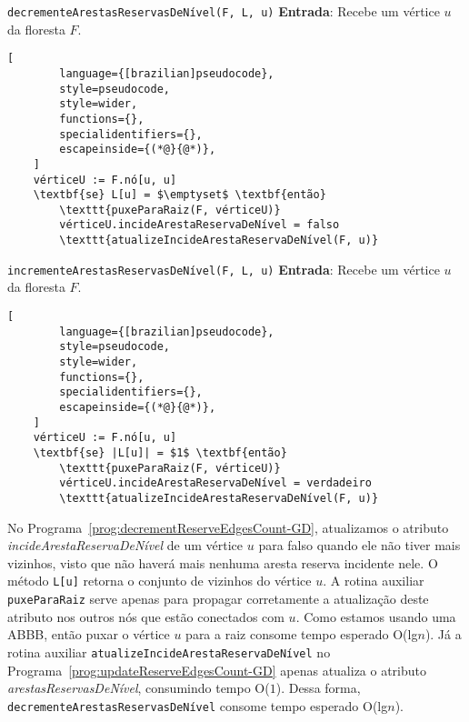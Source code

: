 \begin{programruledcaption}{\texttt{decrementeArestasReservasDeNível(F, L, u)} \label{prog:decrementReserveEdgesCount-GD}}
    \noindent\textbf{Entrada}: Recebe um vértice $u$ da floresta $F$.
    \vspace{-0.5\baselineskip}
    \begin{lstlisting}[
        language={[brazilian]pseudocode},
        style=pseudocode,
        style=wider,
        functions={},
        specialidentifiers={},
        escapeinside={(*@}{@*)},
    ]
    vérticeU := F.nó[u, u]
    \textbf{se} L[u] = $\emptyset$ \textbf{então} 
        \texttt{puxeParaRaiz(F, vérticeU)}
        vérticeU.incideArestaReservaDeNível = falso
        \texttt{atualizeIncideArestaReservaDeNível(F, u)}
    \end{lstlisting}
    \vspace{-0.5\baselineskip}
\end{programruledcaption}

\begin{programruledcaption}{\texttt{incrementeArestasReservasDeNível(F, L, u)} \label{prog:incrementReserveEdgesCount-GD}}
    \noindent\textbf{Entrada}: Recebe um vértice $u$ da floresta $F$.
    \vspace{-0.5\baselineskip}
    \begin{lstlisting}[
        language={[brazilian]pseudocode},
        style=pseudocode,
        style=wider,
        functions={},
        specialidentifiers={},
        escapeinside={(*@}{@*)},
    ]
    vérticeU := F.nó[u, u]
    \textbf{se} |L[u]| = $1$ \textbf{então} 
        \texttt{puxeParaRaiz(F, vérticeU)}
        vérticeU.incideArestaReservaDeNível = verdadeiro
        \texttt{atualizeIncideArestaReservaDeNível(F, u)}
    \end{lstlisting}
    \vspace{-0.5\baselineskip}
\end{programruledcaption}

No Programa~\ref{prog:decrementReserveEdgesCount-GD}, atualizamos o atributo \textit{incideArestaReservaDeNível} de um vértice $u$ para falso quando ele não tiver mais vizinhos, visto que não haverá mais nenhuma aresta reserva incidente nele. O método \texttt{L[u]} retorna o conjunto de vizinhos do vértice $u$. A rotina auxiliar \texttt{puxeParaRaiz} serve apenas para propagar corretamente a atualização deste atributo nos outros nós que estão conectados com $u$. Como estamos usando uma ABBB, então puxar o vértice $u$ para a raiz consome tempo esperado O(lg$n$). Já a rotina auxiliar \texttt{atualizeIncideArestaReservaDeNível} no Programa~\ref{prog:updateReserveEdgesCount-GD} apenas atualiza o atributo \textit{arestasReservasDeNível}, consumindo tempo O($1$). Dessa forma, \texttt{decrementeArestasReservasDeNível} consome tempo esperado O(lg$n$).

